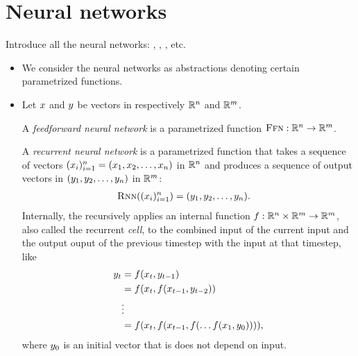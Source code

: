 \section{Neural networks}
Introduce all the neural networks: \ff, \rnn, \lstm, etc.
\begin{itemize}
  \item We consider the neural networks as abstractions denoting certain parametrized functions.
  \item Let $x$ and $y$ be vectors in respectively $\mathbb{R}^{n}$ and $\mathbb{R}^{m}$.

  A \textit{feedforward neural network} is a parametrized function $\textsc{Ffn}: \mathbb{R}^{n} \to \mathbb{R}^{m}$.

  A \textit{recurrent neural network} is a parametrized function \rnn that takes a sequence of vectors $(x_i)_{i=1}^n = ( x_1, x_2, \dots, x_n )$ in $\mathbb{R}^{n}$ and produces a sequence of output vectors in $(y_1,y_2, \dots,y_n )$ in $\mathbb{R}^{m}$:
  \begin{align*}
    \textsc{Rnn}( (x_i)_{i=1}^n ) &= ( y_1, y_2, \dots, y_n ).
  \end{align*}
  Internally, the \rnn recursively applies an internal function $f: \mathbb{R}^{n} \times \mathbb{R}^{m} \to \mathbb{R}^{m}$, also called the recurrent \textit{cell}, to the combined input of the current input and the output ouput of the previous timestep  with the input at that timestep, like
  \begin{align*}
    y_{t} &= f(x_t, y_{t-1})  \\
      &= f(x_t, f(x_{t-1}, y_{t-2}))  \\
      &\vdots \\
      &= f(x_t, f(x_{t-1}, f(\dots f(x_{1}, y_{0})))),
  \end{align*}
  where $y_{0}$ is an initial vector that is does not depend on input.


\end{itemize}
